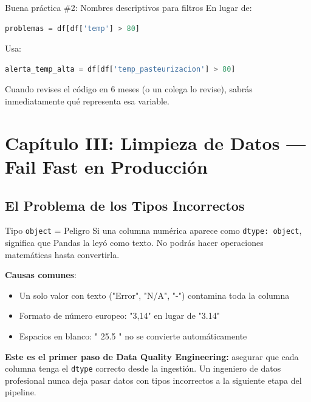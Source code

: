 \documentclass[11pt, a4paper]{article}
\begin{document}
\begin{conceptbox}{Buena práctica \#2: Nombres descriptivos para filtros}
En lugar de:
\begin{lstlisting}[language=Python]
problemas = df[df['temp'] > 80]
\end{lstlisting}

Usa:
\begin{lstlisting}[language=Python]
alerta_temp_alta = df[df['temp_pasteurizacion'] > 80]
\end{lstlisting}

Cuando revises el código en 6 meses (o un colega lo revise), sabrás inmediatamente qué representa esa variable.
\end{conceptbox}

\newpage

\section{Capítulo III: Limpieza de Datos — Fail Fast en Producción}

\subsection{El Problema de los Tipos Incorrectos}

\begin{warningbox}{Tipo \texttt{object} = Peligro}
Si una columna numérica aparece como \texttt{dtype: object}, significa que Pandas la leyó como texto. No podrás hacer operaciones matemáticas hasta convertirla.
\end{warningbox}

\textbf{Causas comunes}:
\begin{itemize}
    \item Un solo valor con texto ("Error", "N/A", "-") contamina toda la columna
    \item Formato de número europeo: "3,14" en lugar de "3.14"
    \item Espacios en blanco: " 25.5 " no se convierte automáticamente
\end{itemize}

\textbf{Este es el primer paso de Data Quality Engineering:} asegurar que cada columna tenga el \texttt{dtype} correcto desde la ingestión. Un ingeniero de datos profesional nunca deja pasar datos con tipos incorrectos a la siguiente etapa del pipeline.
\end{document}
